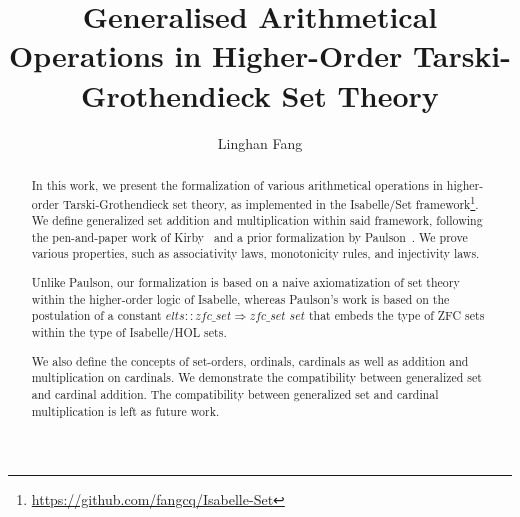 \documentclass[11pt,a4paper]{article}
\begin{document}
\title{Generalised Arithmetical Operations in Higher-Order Tarski-Grothendieck Set Theory}
\author{Linghan Fang}
\maketitle

\begin{abstract}
In this work, we present the formalization of various arithmetical operations in
higher-order Tarski-Grothendieck set theory, as implemented in the Isabelle/Set
framework\footnote{\url{https://github.com/fangcq/Isabelle-Set}}.
We define generalized set addition and multiplication within said framework,
following the pen-and-paper work of Kirby~\cite{kirby_set_arithemtics}
and a prior formalization by Paulson~\cite{ZFC_in_HOL_AFP}.
We prove various properties, such as associativity laws, monotonicity rules, and injectivity laws.

Unlike Paulson, our formalization is based on a naive axiomatization of set theory within the
higher-order logic of Isabelle, whereas Paulson's work is based on the postulation of a constant
$\textit{elts} :: \textit{zfc\_set} \Rightarrow \textit{zfc\_set set}$
that embeds the type of ZFC sets within the type
of Isabelle/HOL sets.

We also define the concepts of set-orders, ordinals, cardinals as well as addition and
multiplication on cardinals. We demonstrate the compatibility between generalized set and cardinal
addition. The compatibility between generalized set and cardinal multiplication is left as future
work.
\end{abstract}

\tableofcontents





\end{document}
